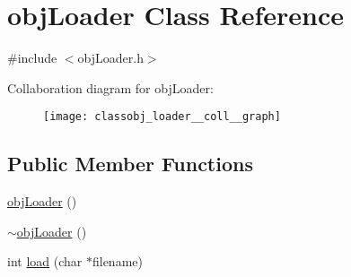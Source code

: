 \hypertarget{classobj_loader}{\section{obj\+Loader Class Reference}
\label{classobj_loader}
}


{\ttfamily \#include $<$obj\+Loader.\+h$>$}



Collaboration diagram for obj\+Loader\+:\nopagebreak
\begin{figure}[H]
\begin{center}
\leavevmode
\texttt{[image: classobj\_loader\_\_coll\_\_graph]}
\end{center}
\end{figure}
\subsection*{Public Member Functions}
\begin{DoxyCompactItemize}
\item 
\hyperlink{classobj_loader_adda1d4defa892f5924d6fcd4edf6d3f8}{obj\+Loader} ()
\item 
\hyperlink{classobj_loader_ae0544f9581456fdf0d820d967c1c3d48}{$\sim$obj\+Loader} ()
\item 
int \hyperlink{classobj_loader_a3dd8724f1e8a00e1e4345087ded8a877}{load} (char $\ast$filename)
\end{DoxyCompactItemize}
